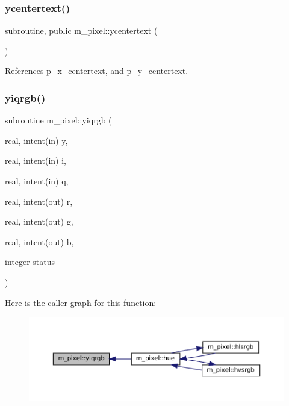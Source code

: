 \mbox{\label{namespacem__pixel_a2e32105b5e77abf38768fec6b11376a3}} 
\subsubsection{\texorpdfstring{ycentertext()}{ycentertext()}}
{\footnotesize\ttfamily subroutine, public m\+\_\+pixel\+::ycentertext (\begin{DoxyParamCaption}{ }\end{DoxyParamCaption})}



References p\+\_\+x\+\_\+centertext, and p\+\_\+y\+\_\+centertext.

\mbox{\label{namespacem__pixel_a0f4f12a4a769b8827a79b44f333eca28}} 
\subsubsection{\texorpdfstring{yiqrgb()}{yiqrgb()}}
{\footnotesize\ttfamily subroutine m\+\_\+pixel\+::yiqrgb (\begin{DoxyParamCaption}\item[{real, intent(in)}]{y,  }\item[{real, intent(in)}]{i,  }\item[{real, intent(in)}]{q,  }\item[{real, intent(out)}]{r,  }\item[{real, intent(out)}]{g,  }\item[{real, intent(out)}]{b,  }\item[{integer}]{status }\end{DoxyParamCaption})\hspace{0.3cm}{\ttfamily [private]}}

Here is the caller graph for this function\+:
\nopagebreak
\begin{figure}[H]
\begin{center}
\leavevmode
\includegraphics[width=350pt]{namespacem__pixel_a0f4f12a4a769b8827a79b44f333eca28_icgraph}
\end{center}
\end{figure}


